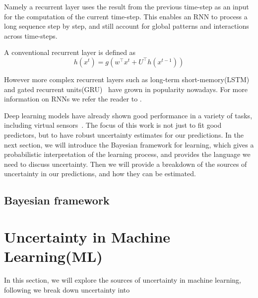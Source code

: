 \documentclass[../main.tex]{subfiles}
\begin{document}
Namely a recurrent layer uses the result from the previous time-step as an input for the computation of the current time-step. This enables an RNN to process a long sequence step by step, and still account for global patterns and interactions across time-steps. 

A conventional recurrent layer is defined as~\citep{pascanu2013construct}
$$
        h(x^t) = g(w^\top x^t + U^\top h(x^{t-1}))
$$

However more complex recurrent layers such as long-term short-memory(LSTM)~\citep{hochreiter1997long} and gated recurrent units(GRU)~\citep{cho2014learning} have grown in popularity nowadays. For more information on RNNs we refer the reader to \cite[chapter~10]{goodfellow2016deep}.

Deep learning models have already shown good performance in a variety of tasks, including virtual sensors~\citep{graber2018hybrid, alonso2019virtual, escobedo2016neural, iwashita2019tu}.
The focus of this work is not just to fit good predictors, but to have robust uncertainty estimates for our predictions. In the next section, we will introduce the Bayesian framework for learning, which gives a probabilistic interpretation of the learning process, and provides the language we need to discuss uncertainty. Then we will provide a breakdown of the sources of uncertainty in our predictions, and how they can be estimated.  

\subsection{Bayesian framework}




\section{Uncertainty in Machine Learning(ML)}

In this section, we will explore the sources of uncertainty in machine learning, following \citet{der2009aleatory} we break down uncertainty into
\end{document}
